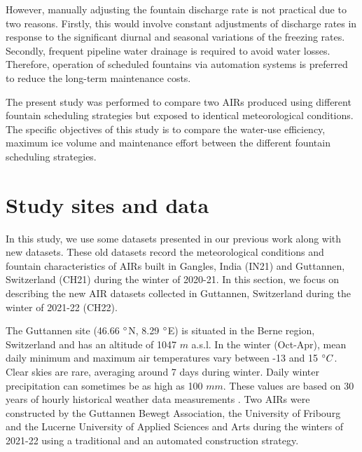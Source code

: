 \documentclass[tc, manuscript]{copernicus}
\begin{document}
However, manually adjusting the fountain discharge rate is not practical due to two reasons. Firstly, this would
involve constant adjustments of discharge rates in response to the significant diurnal and seasonal variations
of the freezing rates. Secondly, frequent pipeline water drainage is required to avoid water losses. Therefore,
operation of scheduled fountains via automation systems is preferred to reduce the long-term maintenance costs.

The present study was performed to compare two AIRs produced using different fountain scheduling strategies but
exposed to identical meteorological conditions. The specific objectives of this study is to compare the
water-use efficiency, maximum ice volume and maintenance effort between the different fountain scheduling strategies.

\section{Study sites and data}

In this study, we use some datasets presented in our previous work
\citep{balasubramanianInfluenceMeteorologicalConditions2022} along with new datasets. These old datasets record
the meteorological conditions and fountain characteristics of AIRs built in Gangles, India (IN21) and Guttannen,
Switzerland (CH21) during the winter of 2020-21. In this section, we focus on describing the new AIR datasets
collected in Guttannen, Switzerland during the winter of 2021-22 (CH22).

The Guttannen site (46.66 $^{\circ}$N, 8.29 $^{\circ}$E) is situated in the Berne region, Switzerland and has an
altitude of 1047 $m$ a.s.l. In the winter (Oct-Apr), mean daily minimum and maximum air temperatures vary
between -13 and 15 $^{\circ} C$. Clear skies are rare, averaging around 7 days during winter. Daily winter
precipitation can sometimes be as high as 100 $mm$. These values are based on 30 years of hourly historical
weather data measurements \citep{meteoblueClimateGuttannen2021}. Two AIRs were constructed by the Guttannen
Bewegt Association, the University of Fribourg and the Lucerne University of Applied Sciences and Arts during
the winters of 2021-22 using a traditional and an automated construction strategy.
\end{document}
